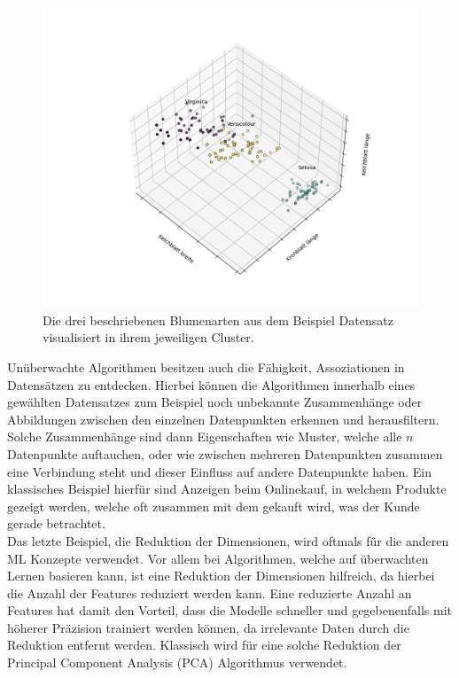 \documentclass[]{iat}
\begin{document}
\begin{figure}[H]
    \includegraphics[width=1\textwidth]{graphics/iris_set_groundtruth.png}
    \centering
    \caption{Die drei beschriebenen Blumenarten aus dem Beispiel Datensatz visualisiert in ihrem jeweiligen Cluster.}
    \label{abb:flower_example}
\end{figure}
Unüberwachte Algorithmen besitzen auch die Fähigkeit, Assoziationen in Datensätzen zu entdecken. Hierbei können die Algorithmen innerhalb eines gewählten Datensatzes zum Beispiel noch unbekannte Zusammenhänge oder Abbildungen zwischen den einzelnen Datenpunkten erkennen und herausfiltern. Solche Zusammenhänge sind dann Eigenschaften wie Muster, welche alle $n$ Datenpunkte auftauchen, oder wie zwischen mehreren Datenpunkten zusammen eine Verbindung steht und dieser Einfluss auf andere Datenpunkte haben. Ein klassisches Beispiel hierfür sind Anzeigen beim Onlinekauf, in welchem Produkte gezeigt werden, welche oft zusammen mit dem gekauft wird, was der Kunde gerade betrachtet.\\
Das letzte Beispiel, die Reduktion der Dimensionen, wird oftmals für die anderen ML Konzepte verwendet. Vor allem bei Algorithmen, welche auf überwachten Lernen basieren kann, ist eine Reduktion der Dimensionen hilfreich, da hierbei die Anzahl der Features reduziert werden kann. Eine reduzierte Anzahl an Features hat damit den Vorteil, dass die Modelle schneller und gegebenenfalls mit höherer Präzision trainiert werden können, da irrelevante Daten durch die Reduktion entfernt werden. Klassisch wird für eine solche Reduktion der Principal Component Analysis (PCA) Algorithmus verwendet. \cite[]{murphy2012machine} \cite[]{FrocMasc2021}
\end{document}

